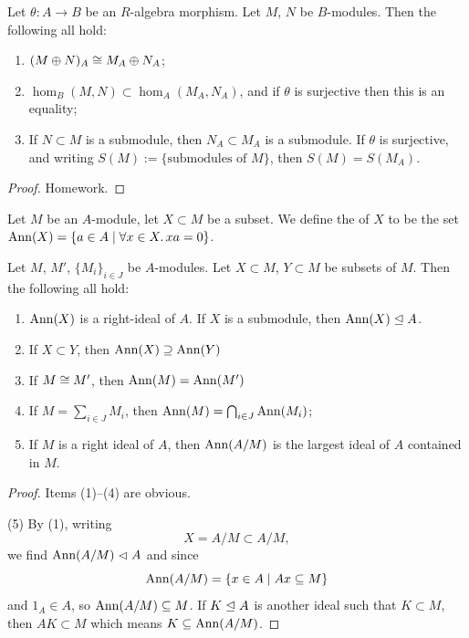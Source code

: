 \begin{lemma}\label{lemma:2.1}
Let $\theta\colon A\to B$ be an $R$-algebra morphism. Let $M$, $N$ be
$B$-modules. Then the following all hold:
\begin{enumerate}
\item $(M\oplus N)_{A}\cong M_{A}\oplus N_{A}$;
\item $\hom_{B}(M,N)\subset\hom_{A}(M_{A},N_{A})$, and if $\theta$ is
  surjective then this is an equality;
\item If $N\subset M$ is a submodule, then $N_{A}\subset M_{A}$ is a
  submodule. If $\theta$ is surjective, and writing $S(M):=\{\mbox{submodules of }M\}$,
  then $S(M)=S(M_{A})$.
\end{enumerate}
\end{lemma}

\begin{proof}
Homework.
\end{proof}

\begin{definition}\label{defn:2.2}
Let $M$ be an $A$-module, let $X\subset M$ be a subset.
We define the  of $X$ to be the set
$\operatorname{Ann}(X)=\{a\in A\mid\forall x\in X\ldotp xa=0\}$.
\end{definition}

\begin{lemma}\label{lemma:2.3}
Let $M$, $M'$, $\{M_{i}\}_{i\in J}$ be $A$-modules.
Let $X\subset M$, $Y\subset M$ be subsets of $M$. Then the following
all hold:
\begin{enumerate}
\item $\operatorname{Ann}(X)$ is a right-ideal of $A$. If $X$ is a
  submodule, then $\operatorname{Ann}(X)\mathrel{\trianglelefteq} A$.
\item If $X\subset Y$, then $\operatorname{Ann}(X)\supseteq\operatorname{Ann}(Y)$
\item If $M\cong M'$, then $\operatorname{Ann}(M)=\operatorname{Ann}(M')$
\item If $M=\sum_{i\in J}M_{i}$, then $\operatorname{Ann}(M)=\bigcap_{i\in J}\operatorname{Ann}(M_{i})$;
\item If $M$ is a right ideal of $A$, then $\operatorname{Ann}(A/M)$ is the
  largest ideal of $A$ contained in $M$.
\end{enumerate}
\end{lemma}

\begin{proof}
Items (1)--(4) are obvious.

(5) By (1), writing
\begin{equation}
X=A/M\subset A/M,
\end{equation}
we find $\operatorname{Ann}(A/M)\mathrel{\lhd} A$ and since
\begin{equation}
\operatorname{Ann}(A/M)=\{x\in A\mid Ax\subseteq M\}
\end{equation}
and $1_{A}\in A$, so $\operatorname{Ann}(A/M)\subseteq M$. If $K\mathrel{\trianglelefteq} A$ is
another ideal such that $K\subset M$, then $AK\subset M$ which means $K\subseteq\operatorname{Ann}(A/M)$.
\end{proof}

